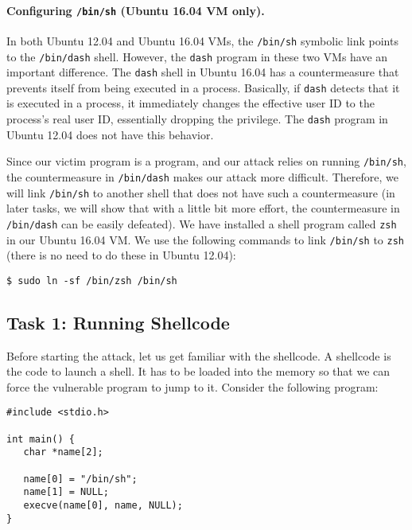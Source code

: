 \paragraph{Configuring \texttt{/bin/sh} (Ubuntu 16.04 VM only).} In both Ubuntu 12.04 and 
Ubuntu 16.04 VMs, the \texttt{/bin/sh} symbolic link points to
the \texttt{/bin/dash} shell. However, the \texttt{dash} program 
in these two VMs have an important difference. 
The \texttt{dash} shell in Ubuntu 16.04 has a countermeasure
that prevents itself from being executed in a \setuid process. 
Basically, if \texttt{dash} detects that it is 
executed in a \setuid process, it immediately 
changes the effective user ID to the process's real user ID, essentially
dropping the privilege. The \texttt{dash} program in Ubuntu 12.04 does not have this 
behavior.    


Since our victim program is a \setuid program, and our 
attack relies on running \texttt{/bin/sh}, the countermeasure
in \texttt{/bin/dash} makes our attack more difficult. Therefore,
we will link \texttt{/bin/sh} to another shell that does not 
have such a countermeasure (in later tasks, we will show that with
a little bit more effort, the countermeasure in \texttt{/bin/dash}
can be easily defeated). We have installed a shell program 
called \texttt{zsh} in our Ubuntu 16.04 VM. We use the following
commands to link \texttt{/bin/sh} to \texttt{zsh} (there is no need to do these in Ubuntu
12.04):  


\begin{lstlisting}
$ sudo ln -sf /bin/zsh /bin/sh
\end{lstlisting}



\subsection{Task 1: Running Shellcode}


Before starting the attack, let us get familiar with the shellcode. A shellcode is the code to
launch a shell. It has to be loaded into the memory so that we can force the
vulnerable program to jump to it. Consider the following program:


\begin{lstlisting}
#include <stdio.h>

int main() {
   char *name[2];

   name[0] = "/bin/sh";
   name[1] = NULL;
   execve(name[0], name, NULL);
}
\end{lstlisting}
 

